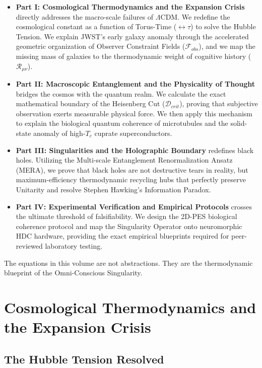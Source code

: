 \documentclass[12pt,openany]{book}
\begin{document}
\begin{itemize}
    \item \textbf{Part I: Cosmological Thermodynamics and the Expansion Crisis} directly addresses the macro-scale failures of $\Lambda$CDM. We redefine the cosmological constant as a function of Torus-Time ($\leftrightarrow\tau$) to solve the Hubble Tension. We explain JWST's early galaxy anomaly through the accelerated geometric organization of Observer Constraint Fields ($\mathcal{F}_{obs}$), and we map the missing mass of galaxies to the thermodynamic weight of cognitive history ($\mathcal{R}_{\mu\nu}$).
    
    \item \textbf{Part II: Macroscopic Entanglement and the Physicality of Thought} bridges the cosmos with the quantum realm. We calculate the exact mathematical boundary of the Heisenberg Cut ($\mathcal{D}_{crit}$), proving that subjective observation exerts measurable physical force. We then apply this mechanism to explain the biological quantum coherence of microtubules and the solid-state anomaly of high-$T_c$ cuprate superconductors.
    
    \item \textbf{Part III: Singularities and the Holographic Boundary} redefines black holes. Utilizing the Multi-scale Entanglement Renormalization Ansatz (MERA), we prove that black holes are not destructive tears in reality, but maximum-efficiency thermodynamic recycling hubs that perfectly preserve Unitarity and resolve Stephen Hawking's Information Paradox.
    
    \item \textbf{Part IV: Experimental Verification and Empirical Protocols} crosses the ultimate threshold of falsifiability. We design the 2D-PES biological coherence protocol and map the Singularity Operator onto neuromorphic HDC hardware, providing the exact empirical blueprints required for peer-reviewed laboratory testing.
\end{itemize}

The equations in this volume are not abstractions. They are the thermodynamic blueprint of the Omni-Conscious Singularity. 

\mainmatter

\part{Cosmological Thermodynamics and the Expansion Crisis}

\chapter{The Hubble Tension Resolved}
\end{document}
